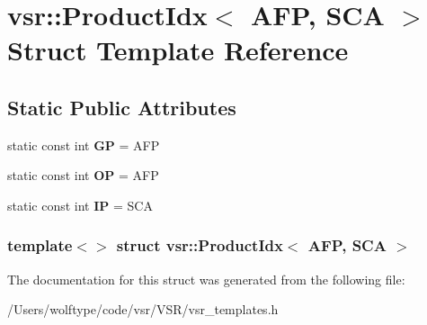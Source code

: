 \hypertarget{structvsr_1_1_product_idx_3_01_a_f_p_00_01_s_c_a_01_4}{\section{vsr\-:\-:Product\-Idx$<$ A\-F\-P, S\-C\-A $>$ Struct Template Reference}
\label{structvsr_1_1_product_idx_3_01_a_f_p_00_01_s_c_a_01_4}
}
\subsection*{Static Public Attributes}
\begin{DoxyCompactItemize}
\item 
\hypertarget{structvsr_1_1_product_idx_3_01_a_f_p_00_01_s_c_a_01_4_aca7f464e8aa54c94fec44d6dae88b3a6}{static const int {\bfseries G\-P} = A\-F\-P}\label{structvsr_1_1_product_idx_3_01_a_f_p_00_01_s_c_a_01_4_aca7f464e8aa54c94fec44d6dae88b3a6}

\item 
\hypertarget{structvsr_1_1_product_idx_3_01_a_f_p_00_01_s_c_a_01_4_a046ddb53d61451de0e59fd50309daa65}{static const int {\bfseries O\-P} = A\-F\-P}\label{structvsr_1_1_product_idx_3_01_a_f_p_00_01_s_c_a_01_4_a046ddb53d61451de0e59fd50309daa65}

\item 
\hypertarget{structvsr_1_1_product_idx_3_01_a_f_p_00_01_s_c_a_01_4_ab731bd71bf3d0c92c6e26c1a1bdab503}{static const int {\bfseries I\-P} = S\-C\-A}\label{structvsr_1_1_product_idx_3_01_a_f_p_00_01_s_c_a_01_4_ab731bd71bf3d0c92c6e26c1a1bdab503}

\end{DoxyCompactItemize}
\subsubsection*{template$<$$>$ struct vsr\-::\-Product\-Idx$<$ A\-F\-P, S\-C\-A $>$}



The documentation for this struct was generated from the following file\-:\begin{DoxyCompactItemize}
\item 
/\-Users/wolftype/code/vsr/\-V\-S\-R/vsr\-\_\-templates.\-h\end{DoxyCompactItemize}
